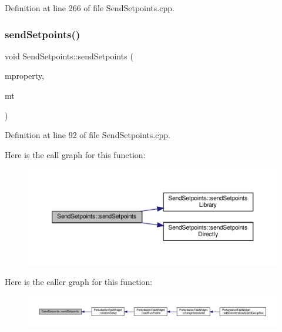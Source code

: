 Definition at line 266 of file Send\+Setpoints.\+cpp.

\mbox{\label{class_send_setpoints_a58e8637367147169467c7d17e1f03947}} 
\subsubsection{\texorpdfstring{send\+Setpoints()}{sendSetpoints()}}
{\footnotesize\ttfamily void Send\+Setpoints\+::send\+Setpoints (\begin{DoxyParamCaption}\item[{\hyperlink{class_send_setpoints_a1205563976ed70d7beace23697cd0b06}{Treadmill\+Property}}]{mproperty,  }\item[{\hyperlink{class_send_setpoints_a36f865e2cf8a800b6226ff7b6b03abcd}{Setpoint\+Type}}]{mt }\end{DoxyParamCaption})}



Definition at line 92 of file Send\+Setpoints.\+cpp.

Here is the call graph for this function\+:
\nopagebreak
\begin{figure}[H]
\begin{center}
\leavevmode
\includegraphics[width=350pt]{class_send_setpoints_a58e8637367147169467c7d17e1f03947_cgraph}
\end{center}
\end{figure}
Here is the caller graph for this function\+:
\nopagebreak
\begin{figure}[H]
\begin{center}
\leavevmode
\includegraphics[width=350pt]{class_send_setpoints_a58e8637367147169467c7d17e1f03947_icgraph}
\end{center}
\end{figure}
\mbox{\label{class_send_setpoints_ae4415d646c6de144cad9682b7afa1026}} 
